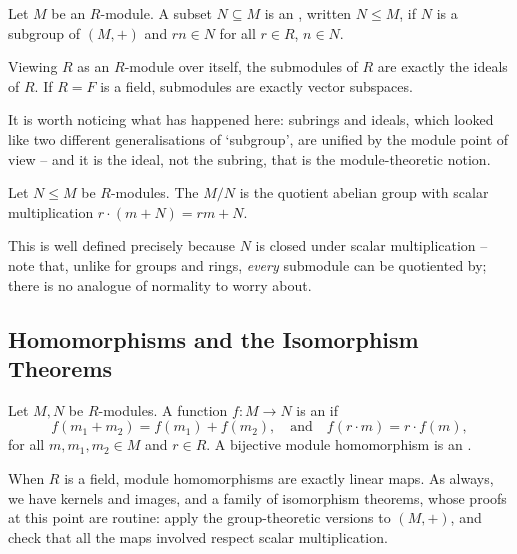 \begin{definition}[Submodule]
	Let $M$ be an $R$-module. A subset $N \subseteq M$ is an , written $N \leq M$, if $N$ is a subgroup of $(M, +)$ and $rn \in N$ for all $r \in R$, $n \in N$.
\end{definition}

\begin{example}
	Viewing $R$ as an $R$-module over itself, the submodules of $R$ are exactly the ideals of $R$. If $R = F$ is a field, submodules are exactly vector subspaces.
\end{example}

It is worth noticing what has happened here: subrings and ideals, which looked like two different generalisations of `subgroup', are unified by the module point of view -- and it is the ideal, not the subring, that is the module-theoretic notion.

\begin{definition}
	Let $N \leq M$ be $R$-modules. The  $M/N$ is the quotient abelian group with scalar multiplication $r \cdot (m + N) = rm + N$.
\end{definition}

This is well defined precisely because $N$ is closed under scalar multiplication -- note that, unlike for groups and rings, \emph{every} submodule can be quotiented by; there is no analogue of normality to worry about.

\subsection{Homomorphisms and the Isomorphism Theorems}

\begin{definition}
	Let $M, N$ be $R$-modules. A function $f: M \rightarrow N$ is an  if
	$$
	f(m_1 + m_2) = f(m_1) + f(m_2), \quad \text{and} \quad f(r \cdot m) = r \cdot f(m),
	$$
	for all $m, m_1, m_2 \in M$ and $r \in R$. A bijective module homomorphism is an .
\end{definition}

When $R$ is a field, module homomorphisms are exactly linear maps. As always, we have kernels and images, and a family of isomorphism theorems, whose proofs at this point are routine: apply the group-theoretic versions to $(M, +)$, and check that all the maps involved respect scalar multiplication.

